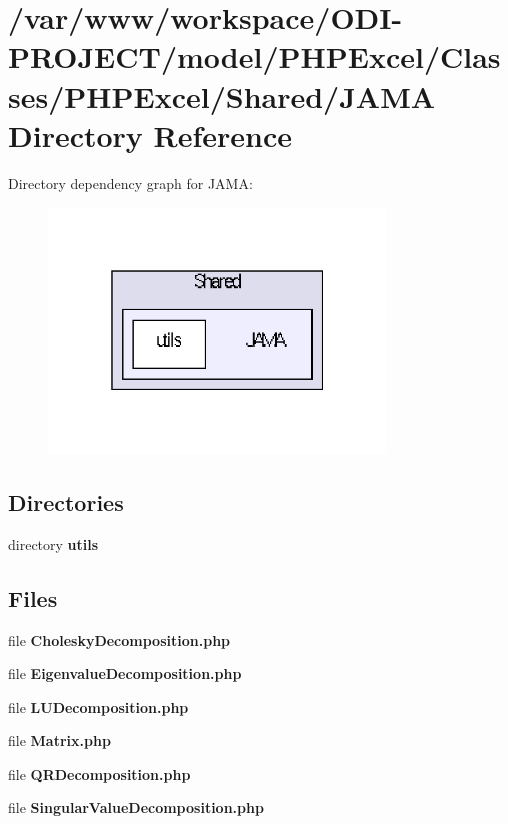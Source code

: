 \section{/var/www/workspace/\+O\+D\+I-\/\+P\+R\+O\+J\+E\+C\+T/model/\+P\+H\+P\+Excel/\+Classes/\+P\+H\+P\+Excel/\+Shared/\+J\+A\+M\+A Directory Reference}
\label{dir_bce220440ddc3349cc36c99501a64483}
Directory dependency graph for J\+A\+M\+A\+:\nopagebreak
\begin{figure}[H]
\begin{center}
\leavevmode
\includegraphics[width=254pt]{dir_bce220440ddc3349cc36c99501a64483_dep}
\end{center}
\end{figure}
\subsection*{Directories}
\begin{DoxyCompactItemize}
\item 
directory {\bf utils}
\end{DoxyCompactItemize}
\subsection*{Files}
\begin{DoxyCompactItemize}
\item 
file {\bfseries Cholesky\+Decomposition.\+php}
\item 
file {\bfseries Eigenvalue\+Decomposition.\+php}
\item 
file {\bfseries L\+U\+Decomposition.\+php}
\item 
file {\bfseries Matrix.\+php}
\item 
file {\bfseries Q\+R\+Decomposition.\+php}
\item 
file {\bfseries Singular\+Value\+Decomposition.\+php}
\end{DoxyCompactItemize}
